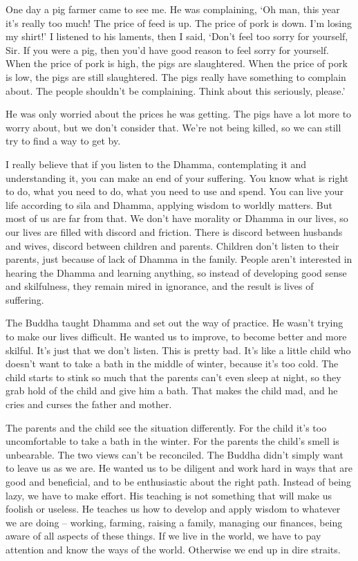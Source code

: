 One day a pig farmer came to see me. He was complaining, `Oh man, this year it's really too much! The price of feed is up. The price of pork is down. I'm losing my shirt!' I listened to his laments, then I said, `Don't feel too sorry for yourself, Sir. If you were a pig, then you'd have good reason to feel sorry for yourself. When the price of pork is high, the pigs are slaughtered. When the price of pork is low, the pigs are still slaughtered. The pigs really have something to complain about. The people shouldn't be complaining. Think about this seriously, please.' 

He was only worried about the prices he was getting. The pigs have a lot more to worry about, but we don't consider that. We're not being killed, so we can still try to find a way to get by. 

I really believe that if you listen to the Dhamma, contemplating it and understanding it, you can make an end of your suffering. You know what is right to do, what you need to do, what you need to use and spend. You can live your life according to s\={\i}la and Dhamma, applying wisdom to worldly matters. But most of us are far from that. We don't have morality or Dhamma in our lives, so our lives are filled with discord and friction. There is discord between husbands and wives, discord between children and parents. Children don't listen to their parents, just because of lack of Dhamma in the family. People aren't interested in hearing the Dhamma and learning anything, so instead of developing good sense and skilfulness, they remain mired in ignorance, and the result is lives of suffering. 

The Buddha taught Dhamma and set out the way of practice. He wasn't trying to make our lives difficult. He wanted us to improve, to become better and more skilful. It's just that we don't listen. This is pretty bad. It's like a little child who doesn't want to take a bath in the middle of winter, because it's too cold. The child starts to stink so much that the parents can't even sleep at night, so they grab hold of the child and give him a bath. That makes the child mad, and he cries and curses the father and mother. 

The parents and the child see the situation differently. For the child it's too uncomfortable to take a bath in the winter. For the parents the child's smell is unbearable. The two views can't be reconciled. The Buddha didn't simply want to leave us as we are. He wanted us to be diligent and work hard in ways that are good and beneficial, and to be enthusiastic about the right path. Instead of being lazy, we have to make effort. His teaching is not something that will make us foolish or useless. He teaches us how to develop and apply wisdom to whatever we are doing -- working, farming, raising a family, managing our finances, being aware of all aspects of these things. If we live in the world, we have to pay attention and know the ways of the world. Otherwise we end up in dire straits. 

